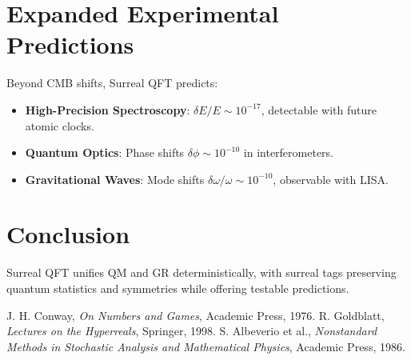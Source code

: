 \documentclass{article}
\begin{document}
\section{Expanded Experimental Predictions}
Beyond CMB shifts, Surreal QFT predicts:
\begin{itemize}
    \item \textbf{High-Precision Spectroscopy}: \(\delta E / E \sim 10^{-17}\), detectable with future atomic clocks.
    \item \textbf{Quantum Optics}: Phase shifts \(\delta \phi \sim 10^{-10}\) in interferometers.
    \item \textbf{Gravitational Waves}: Mode shifts \(\delta \omega / \omega \sim 10^{-10}\), observable with LISA.
\end{itemize}

\section{Conclusion}
Surreal QFT unifies QM and GR deterministically, with surreal tags preserving quantum statistics and symmetries while offering testable predictions.

\begin{thebibliography}{9}
 J. H. Conway, \emph{On Numbers and Games}, Academic Press, 1976.
 R. Goldblatt, \emph{Lectures on the Hyperreals}, Springer, 1998.
 S. Albeverio et al., \emph{Nonstandard Methods in Stochastic Analysis and Mathematical Physics}, Academic Press, 1986.
\end{thebibliography}
\end{document}
